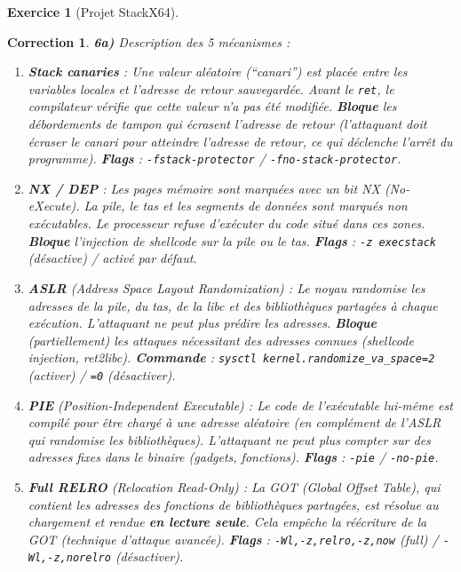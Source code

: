\documentclass[a4paper,11pt]{article}
\theoremstyle{plain}
\newtheorem{correction}{Correction}
\theoremstyle{definition}
\newtheorem{exercice}{Exercice}
\begin{document}
\begin{exercice}[Projet StackX64]
\begin{correction}
\textbf{6a)} Description des 5 mécanismes :

\begin{enumerate}
\item \textbf{Stack canaries} : Une valeur aléatoire (``canari'') est placée entre les variables locales et l'adresse de retour sauvegardée. Avant le \texttt{ret}, le compilateur vérifie que cette valeur n'a pas été modifiée. \textbf{Bloque} les débordements de tampon qui écrasent l'adresse de retour (l'attaquant doit écraser le canari pour atteindre l'adresse de retour, ce qui déclenche l'arrêt du programme). \textbf{Flags} : \texttt{-fstack-protector} / \texttt{-fno-stack-protector}.

\item \textbf{NX / DEP} : Les pages mémoire sont marquées avec un bit NX (No-eXecute). La pile, le tas et les segments de données sont marqués non exécutables. Le processeur refuse d'exécuter du code situé dans ces zones. \textbf{Bloque} l'injection de shellcode sur la pile ou le tas. \textbf{Flags} : \texttt{-z execstack} (désactive) / activé par défaut.

\item \textbf{ASLR} (\textit{Address Space Layout Randomization}) : Le noyau randomise les adresses de la pile, du tas, de la libc et des bibliothèques partagées à chaque exécution. L'attaquant ne peut plus prédire les adresses. \textbf{Bloque} (partiellement) les attaques nécessitant des adresses connues (shellcode injection, ret2libc). \textbf{Commande} : \texttt{sysctl kernel.randomize\_va\_space=2} (activer) / \texttt{=0} (désactiver).

\item \textbf{PIE} (\textit{Position-Independent Executable}) : Le code de l'exécutable lui-même est compilé pour être chargé à une adresse aléatoire (en complément de l'ASLR qui randomise les bibliothèques). L'attaquant ne peut plus compter sur des adresses fixes dans le binaire (gadgets, fonctions). \textbf{Flags} : \texttt{-pie} / \texttt{-no-pie}.

\item \textbf{Full RELRO} (\textit{Relocation Read-Only}) : La GOT (\textit{Global Offset Table}), qui contient les adresses des fonctions de bibliothèques partagées, est résolue au chargement et rendue \textbf{en lecture seule}. Cela empêche la réécriture de la GOT (technique d'attaque avancée). \textbf{Flags} : \texttt{-Wl,-z,relro,-z,now} (full) / \texttt{-Wl,-z,norelro} (désactiver).
\end{enumerate}


\end{correction}
\end{exercice}
\end{document}
